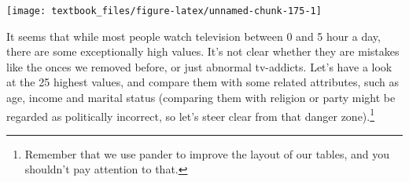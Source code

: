 \documentclass[]{tufte-book}
\newenvironment{Shaded}{}{}
\newcommand{\DecValTok}[1]{\textcolor[rgb]{0.25,0.63,0.44}{#1}}
\newcommand{\KeywordTok}[1]{\textcolor[rgb]{0.00,0.44,0.13}{\textbf{#1}}}
\newcommand{\NormalTok}[1]{#1}
\newcommand{\OperatorTok}[1]{\textcolor[rgb]{0.40,0.40,0.40}{#1}}
\newcommand{\StringTok}[1]{\textcolor[rgb]{0.25,0.44,0.63}{#1}}
\begin{document}
\texttt{[image: textbook\_files/figure-latex/unnamed-chunk-175-1]}

It seems that while most people watch television between 0 and 5 hour a day, there are some exceptionally high values. It's not clear whether they are mistakes like the onces we removed before, or just abnormal tv-addicts. Let's have a look at the 25 highest values, and compare them with some related attributes, such as age, income and marital status (comparing them with religion or party might be regarded as politically incorrect, so let's steer clear from that danger zone).\footnote{Remember that we use pander to improve the layout of our tables, and you shouldn't pay attention to that.}

\begin{Shaded}
\end{Shaded}
\end{document}
